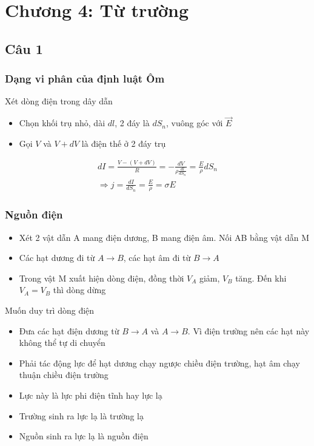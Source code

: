 \section[Chương 4]{Chương 4: Từ trường}

\subsection{Câu 1}

\subsubsection{Dạng vi phân của định luật Ôm}

Xét dòng điện trong dây dẫn

\begin{itemize}
  \item Chọn khối trụ nhỏ, dài $dl$, 2 đáy là $dS_n$, vuông góc với $\vec{E}$
  \item Gọi $V$ và $V+dV$ là điện thế ở 2 đáy trụ
\end{itemize}

\begin{gather*}
  dI = \frac{V - (V + dV)}{R} = -\frac{dV}{\rho \frac{dl}{dS_n}} = \frac{E}{\rho} dS_n \\
  \Rightarrow j = \frac{dI}{dS_n} = \frac{E}{\rho} = \sigma E
\end{gather*}

\subsubsection{Nguồn điện}

\begin{itemize}
  \item Xét 2 vật dẫn A mang điện dương, B mang điện âm. Nối AB bằng vật dẫn M
  \item Các hạt dương đi từ $A \to B$, các hạt âm đi từ $B \to A$
  \item Trong vật M xuất hiện dòng điện, đồng thời $V_A$ giảm, $V_B$ tăng. Đến khi $V_A = V_B$ thì dòng dừng
\end{itemize}

Muốn duy trì dòng điện

\begin{itemize}
  \item Đưa các hạt điện dương từ $B \to A$ và $A \to B$. Vì điện trường nên các hạt này không thể tự di chuyển
  \item Phải tác động lực để hạt dương chạy ngược chiều điện trường, hạt âm chạy thuận chiều điện trường
  \item Lực này là lực phi điện tĩnh hay lực lạ
  \item Trường sinh ra lực lạ là trường lạ
  \item Nguồn sinh ra lực lạ là nguồn điện
\end{itemize}


